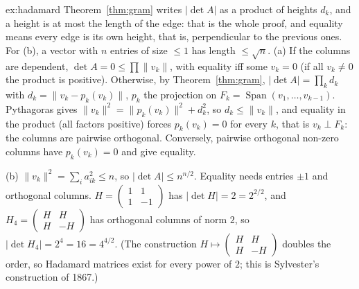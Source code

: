 \begin{solution}{ex:hadamard}
\idea Theorem~\ref{thm:gram} writes $|\det A|$ as a product of heights $d_k$, and a height is at most the length of the edge: that is the whole proof, and equality means every edge is its own height, that is, perpendicular to the previous ones. For (b), a vector with $n$ entries of size $\le1$ has length $\le\sqrt n$.
\writeup (a) If the columns are dependent, $\det A=0\le\prod\|v_k\|$, with equality iff some $v_k=0$ (if all $v_k\ne0$ the product is positive). Otherwise, by Theorem~\ref{thm:gram}, $|\det A|=\prod_kd_k$ with $d_k=\|v_k-p_k(v_k)\|$, $p_k$ the projection on $F_k=\operatorname{Span}(v_1,\dots,v_{k-1})$. Pythagoras gives $\|v_k\|^2=\|p_k(v_k)\|^2+d_k^2$, so $d_k\le\|v_k\|$, and equality in the product (all factors positive) forces $p_k(v_k)=0$ for every $k$, that is $v_k\perp F_k$: the columns are pairwise orthogonal. Conversely, pairwise orthogonal non-zero columns have $p_k(v_k)=0$ and give equality.

(b) $\|v_k\|^2=\sum_ia_{ik}^2\le n$, so $|\det A|\le n^{n/2}$. Equality needs entries $\pm1$ and orthogonal columns. $H=\begin{pmatrix}1&1\\1&-1\end{pmatrix}$ has $|\det H|=2=2^{2/2}$, and $H_4=\begin{pmatrix}H&H\\H&-H\end{pmatrix}$ has orthogonal columns of norm $2$, so $|\det H_4|=2^4=16=4^{4/2}$. (The construction $H\mapsto\begin{pmatrix}H&H\\H&-H\end{pmatrix}$ doubles the order, so Hadamard matrices exist for every power of $2$; this is Sylvester's construction of 1867.)
\end{solution}

